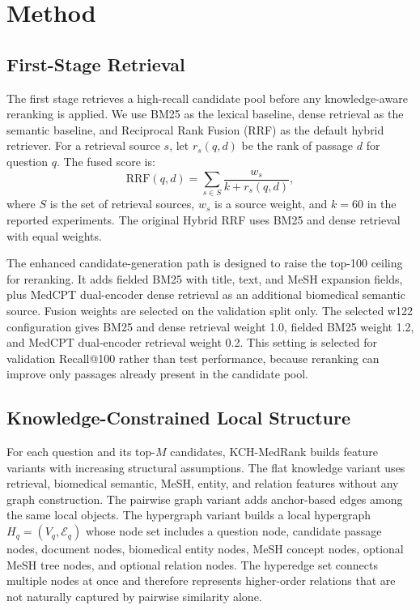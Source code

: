 \section{Method}



\subsection{First-Stage Retrieval}

The first stage retrieves a high-recall candidate pool before any knowledge-aware reranking is applied. We use BM25 as the lexical baseline, dense retrieval as the semantic baseline, and Reciprocal Rank Fusion (RRF) as the default hybrid retriever. For a retrieval source $s$, let $r_s(q,d)$ be the rank of passage $d$ for question $q$. The fused score is:
\[
  \mathrm{RRF}(q,d)=\sum_{s \in S}\frac{w_s}{k+r_s(q,d)},
\]
where $S$ is the set of retrieval sources, $w_s$ is a source weight, and $k=60$ in the reported experiments. The original Hybrid RRF uses BM25 and dense retrieval with equal weights.

The enhanced candidate-generation path is designed to raise the top-100 ceiling for reranking. It adds fielded BM25 with title, text, and MeSH expansion fields, plus MedCPT dual-encoder dense retrieval as an additional biomedical semantic source. Fusion weights are selected on the validation split only. The selected w122 configuration gives BM25 and dense retrieval weight 1.0, fielded BM25 weight 1.2, and MedCPT dual-encoder retrieval weight 0.2. This setting is selected for validation Recall@100 rather than test performance, because reranking can improve only passages already present in the candidate pool.

\subsection{Knowledge-Constrained Local Structure}

For each question and its top-$M$ candidates, KCH-MedRank builds feature variants with increasing structural assumptions. The flat knowledge variant uses retrieval, biomedical semantic, MeSH, entity, and relation features without any graph construction. The pairwise graph variant adds anchor-based edges among the same local objects. The hypergraph variant builds a local hypergraph $H_q=(V_q,\mathcal{E}_q)$ whose node set includes a question node, candidate passage nodes, document nodes, biomedical entity nodes, MeSH concept nodes, optional MeSH tree nodes, and optional relation nodes. The hyperedge set connects multiple nodes at once and therefore represents higher-order relations that are not naturally captured by pairwise similarity alone.

